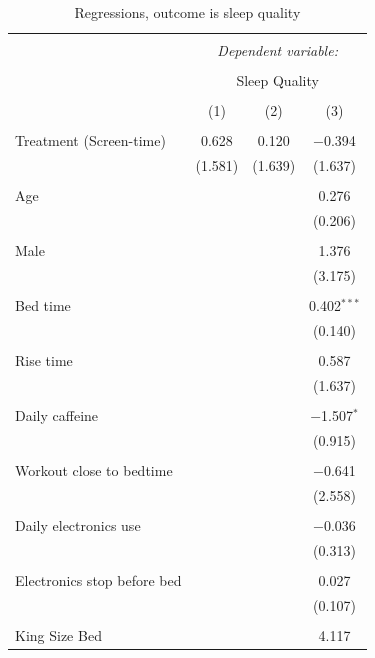 \documentclass[]{article}
\begin{document}
\begin{table}[!htbp] \centering 
  \caption{\label{tab:quality_regressions} Regressions, outcome is sleep quality} 
  \label{} 
\begin{tabular}{@{\extracolsep{5pt}}lccc} 
\\[-1.8ex]\hline 
\hline \\[-1.8ex] 
 & \multicolumn{3}{c}{\textit{Dependent variable:}} \\ 
\cline{2-4} 
\\[-1.8ex] & \multicolumn{3}{c}{Sleep Quality} \\ 
\\[-1.8ex] & (1) & (2) & (3)\\ 
\hline \\[-1.8ex] 
 Treatment (Screen-time) & 0.628 & 0.120 & $-$0.394 \\ 
  & (1.581) & (1.639) & (1.637) \\ 
  & & & \\ 
 Age &  &  & 0.276 \\ 
  &  &  & (0.206) \\ 
  & & & \\ 
 Male &  &  & 1.376 \\ 
  &  &  & (3.175) \\ 
  & & & \\ 
 Bed time &  &  & 0.402$^{***}$ \\ 
  &  &  & (0.140) \\ 
  & & & \\ 
 Rise time &  &  & 0.587 \\ 
  &  &  & (1.637) \\ 
  & & & \\ 
 Daily caffeine &  &  & $-$1.507$^{*}$ \\ 
  &  &  & (0.915) \\ 
  & & & \\ 
 Workout close to bedtime &  &  & $-$0.641 \\ 
  &  &  & (2.558) \\ 
  & & & \\ 
 Daily electronics use &  &  & $-$0.036 \\ 
  &  &  & (0.313) \\ 
  & & & \\ 
 Electronics stop before bed &  &  & 0.027 \\ 
  &  &  & (0.107) \\ 
  & & & \\ 
 King Size Bed &  &  & 4.117 \\ 

\end{tabular}
\end{table}
\end{document}
